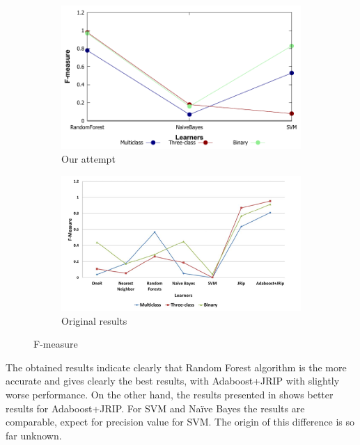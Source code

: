 \begin{figure}[H]
    \centering
    \begin{subfigure}[t]{0.5\textwidth}
        \includegraphics[width=\linewidth]{images/weka_f1}
        \caption{Our attempt}
    \end{subfigure}%
    \begin{subfigure}[t]{0.5\textwidth}
        \includegraphics[width=\linewidth]{images/weka_f1_cite.png}
        \caption{Original results \cite{borges_hink_machine_2014-1}}
    \end{subfigure}
    \caption{F-measure}
    \label{fig:weka_f1}
\end{figure}

The obtained results indicate clearly that Random Forest algorithm is the more accurate and gives clearly the best results, with Adaboost+JRIP with slightly worse performance. On the other hand, the results presented in \cite{borges_hink_machine_2014-1} shows better results for Adaboost+JRIP. For SVM and Naïve Bayes the results are comparable, expect for precision value for SVM. The origin of this difference is so far unknown.


